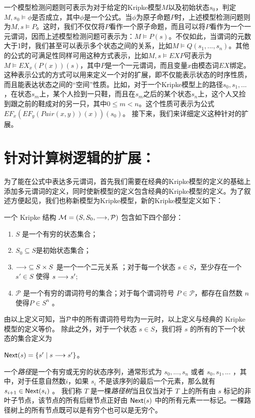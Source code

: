 一个\CTL{}模型检测问题则可表示为对于给定的Kripke模型$M$以及初始状态$s_0$，判定$M,s_0\models \phi$是否成立，其中$\phi$是一个\CTL{}公式。当$\phi$为原子命题$P$时，上述\CTL{}模型检测问题则为$M,s\models P$。这时，我们不仅仅将$P$看作一个原子命题，而且可以将$P$看作为一个一元谓词，因而上述模型检测问题可表示为：$M\models P(s)$。不仅如此，当谓词的元数大于1时，我们甚至可以表示多个状态之间的关系，比如$M\models Q(s_1,...,s_n)$。其他的\CTL{}公式的可满足性同样可用这种方式表示，比如$M,s\models EX P$可表示为$M\models EX_x(P(x))(s)$，其中$P$是一个一元谓词，而且变量$x$由模态词$EX$绑定。这种表示\CTL{}公式的方式可以用来定义一个对\CTL{}的扩展，即不仅能表示状态的时序性质，而且能表达状态之间的“空间”性质。比如，对于一个Kripke模型上的路径$s_0,s_1,...$，在状态$s_m$上，某个人捡到一只鞋，而且在$s_m$之后的某个状态$s_n$上，这个人又捡到跟之前的鞋成对的另一只，其中$0\le m<n$。这个性质可表示为公式$EF_x(EF_y(Pair(x,y))(x))(s_0)$。
接下来，我们来详细定义这种针对\CTL{}的扩展。

\section{针对计算树逻辑\CTL{}的扩展：\CTLP{}}\label{sec:ctlp}
为了能在公式中表达多元谓词，首先我们需要在经典的Kripke模型的定义的基础上添加多元谓词的定义，同时使新模型的定义包含经典的Kripke模型的定义。为了叙述方便起见，我们也称新模型为Kripke模型，新的Kripke模型定义如下：

\begin{definition}[本文中的Kripke 模型]
	一个 Kripke 结构 ${\cal M} = (S, S_0,\longrightarrow, \mathcal{P})$ 包含如下四个部分：
	\begin{enumerate}
		\item $S$ 是一个有穷的状态集合；
		\item $S_0\subseteq S$是初始状态集合；
		\item $\longrightarrow\;\subseteq S \times S$ 是一个一个二元关系 ；对于每一个状态 $s\in S$，至少存在一个 $s'\in S$ 使得 $s\longrightarrow s'$;
		\item $\mathcal{P}$ 是一个有穷的谓词符号的集合；对于每个谓词符号 $P\in \mathcal{P}$，都存在自然数 $n$ 使得$P\in S^n$ 。
	\end{enumerate}
\end{definition}
由以上定义可知，当$\cal P$中的所有谓词符号均为一元时，以上定义与经典的 Kripke 模型的定义等价。
除此之外，对于一个状态 $s\in S$，我们将 $s$ 的所有的下一个状态的集合定义为
\begin{center}
	$\textsf{Next}({s}) = \{s'\mid s\longrightarrow s'\}$。 
\end{center} 
一个\textit{路径}是一个有穷或无穷的状态序列，通常形式为 $s_0,...,s_n$ 或者 $s_0,s_1,...$ ，其中，对于任意自然数$i$，如果 $s_i$ 不是该序列的最后一个元素，那么就有 $s_{i+1}\in \textsf{Next}({s_i})$ 。
我们称 $T$ 是一棵\textit{路径树}当且仅当对于 $T$ 上的所有由 $s$ 标记的非叶子节点，该节点的所有后继节点正好由 $\textsf{Next}({s})$ 中的所有元素一一标记。一棵路径树上的所有节点既可以是有穷个也可以是无穷个。

